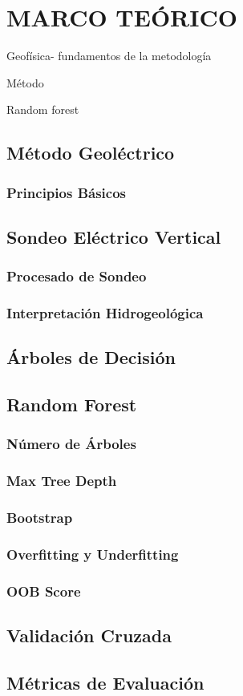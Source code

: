 \chapter{MARCO TEÓRICO}

Geofísica- fundamentos de la metodología  

Método

Random forest



\section{Método Geoléctrico}

\subsection{Principios Básicos}

\section{Sondeo Eléctrico Vertical}

\subsection{Procesado de Sondeo}

\subsection{Interpretación Hidrogeológica}

\section{Árboles de Decisión}

\section{Random Forest}

\subsection{Número de Árboles}

\subsection{Max Tree Depth}

\subsection{Bootstrap}

\subsection{Overfitting y Underfitting}

\subsection{OOB Score}

\section{Validación Cruzada}

\section{Métricas de Evaluación}
